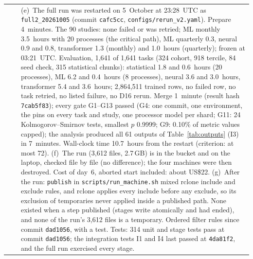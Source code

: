 \documentclass[11pt,a4paper]{article}
\newcommand{\code}[1]{\texttt{#1}}
\begin{document}
\begin{longtable}{@{}p{1.3cm} p{1.9cm} p{11.8cm}@{}}
 & & (e)~The full run was restarted on 5~October at 23:28~UTC as \mbox{\code{full2_20261005}} (commit \code{cafc5cc}, \mbox{\code{configs/rerun_v2.yaml}}). Prepare 4~minutes. The 90 studies: none failed or was retried; ML monthly 3.5~hours with 20 processes (the critical path), ML quarterly 0.3, neural 0.9 and 0.8, transformer 1.3 (monthly) and 1.0~hours (quarterly); frozen at 03:21~UTC. Evaluation, 1,641 of 1,641 tasks (324 cohort, 918 tercile, 84 seed check, 315 statistical chunks): statistical 1.8 and 0.6~hours (20 processes), ML 6.2 and 0.4~hours (8 processes), neural 3.6 and 3.0~hours, transformer 5.4 and 3.6~hours; 2,864,511 trained rows, no failed row, no task retried, no listed failure, no D16 rerun. Merge 1~minute (result hash \code{7cab5f83}); every gate G1--G13 passed (G4: one commit, one environment, the pins on every task and study, one processor model per shard; G11: 24 Kolmogorov--Smirnov tests, smallest $p$ 0.9999; G9: 0.10\% of metric values capped); the analysis produced all 61 outputs of Table~\ref{tab:outputs} (I3) in 7~minutes. Wall-clock time 10.7~hours from the restart (criterion: at most 72). (f)~The run (3,612 files, 2.7\,GB) is in the bucket and on the laptop, checked file by file (no difference); the four machines were then destroyed. Cost of day~6, aborted start included: about US\$22. (g)~After the run: \code{publish} in \mbox{\code{scripts/run_machine.sh}} mixed rclone include and exclude rules, and rclone applies every include before any exclude, so its exclusion of temporaries never applied inside a published path. None existed when a step published (stages write atomically and had ended), and none of the run's 3,612 files is a temporary. Ordered filter rules since commit \code{dad1056}, with a test. Tests: 314 unit and stage tests pass at commit \code{dad1056}; the integration tests I1 and I4 last passed at \code{4da81f2}, and the full run exercised every stage. \\

\end{longtable}
\end{document}
